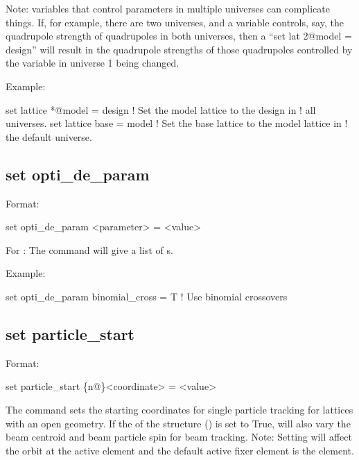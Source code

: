 {{{Note: \tao variables that control parameters in multiple universes can complicate things. If, for
example, there are two universes, and a \tao variable controls, say, the quadrupole strength of
quadrupoles in both universes, then a ``set lat 2@model = design'' will result in the quadrupole
strengths of those quadrupoles controlled by the variable in universe 1 being changed.

Example:
\begin{example}
  set lattice *@model = design  ! Set the model lattice to the design in 
                                !   all universes.
  set lattice base = model      ! Set the base lattice to the model lattice in 
                                !   the default universe.
\end{example}


\subsection{set opti_de_param}
\label{s:set.opti.de.param}

Format:
\begin{example}
  set opti_de_param <parameter> = <value>
\end{example}

For : The  command will give a list of s.

Example:
\begin{example}
  set opti_de_param binomial_cross = T  ! Use binomial crossovers 
\end{example}


\subsection{set particle_start}
\label{s:set.particle.start}

Format:
\begin{example}
  set particle_start \{n@\}<coordinate> = <value>
\end{example}
The  command sets the starting coordinates for single particle tracking for
lattices with an open geometry. If the  of the 
structure () is set to True,  will also vary the beam centroid
and beam particle spin for beam tracking.
Note: Setting  will affect the orbit at the active  element and the 
default active fixer element is the  element.

}}}
